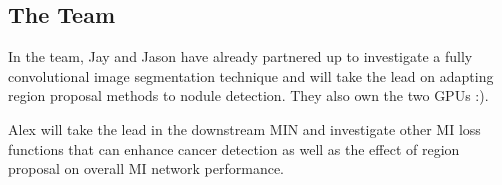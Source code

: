 \documentclass[twocolumn,10pt]{article}
\begin{document}
\subsection{The Team}
In the team, Jay and Jason have already partnered up to investigate a
fully convolutional image segmentation technique and will take the lead on
adapting region proposal methods to nodule detection. They also own the
two GPUs :).

Alex will take the lead in the downstream MIN and investigate other MI loss 
functions that can enhance cancer detection as well as the effect of region 
proposal on overall MI network performance.


\end{document}
